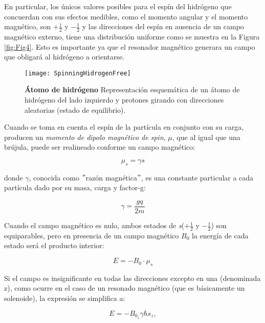 \documentclass[11pt,letterpaper]{article}
\numberwithin{equation}{subsection}
\numberwithin{table}{subsection}
\begin{document}
\bigskip
\noindent En particular, los únicos valores posibles para el espín del hidrógeno que concuerdan con sus efectos medibles, como el momento angular y el momento magnético, son $+\frac{1}{2}$ y $-\frac{1}{2}$ \cite{brown2014magnetic} y las direcciones del espín en ausencia de un campo magnético externo, tiene una distribución uniforme como se muestra en la Figura \ref{fig:Fig4}. Esto es importante ya que el resonador magnético generara un campo que obligará al hidrógeno a orientarse. 

\begin{figure}[H]
\centering
	\texttt{[image: SpinningHidrogenFree]}
	\captionsetup{labelfont=bf}
	\caption{\scriptsize \textbf{Átomo de hidrógeno} Representación esquemática de un átomo de hidrógeno del lado izquierdo y protones girando con direcciones aleatorias (estado de equilibrio).}
	\label{fig:Fig5}
\end{figure}


\bigskip
\noindent Cuando se toma en cuenta el espín de la partícula en conjunto con su carga, producen un \textit{momento de dipolo magnético de spin}, $\mu$, que al igual que una brújula, puede ser realineado conforme un campo magnético:

\begin{equation}
\mu_s = \gamma s
\end{equation}

\noindent donde $\gamma$, conocida como $"$razón magnética$"$, es una constante particular a cada partícula dado por su masa, carga y factor-g:

\begin{equation}
\gamma = \frac{gq}{2m}
\end{equation}

\noindent Cuando el campo magnético es nulo, ambos estados de \textit{s}($+\frac{1}{2}$ y $-\frac{1}{2}$) son equiparables, pero en presencia de un campo magnético $B_0$ la energía de cada estado será el producto interior: 

\begin{equation}
E = -B_0 \cdot \mu_s
\end{equation}

\bigskip
\noindent Si el campo es insignificante en todas las direcciones excepto en una (denominada z), como ocurre en el caso de un resonado magnético (que es básicamente un solenoide), la expresión se simplifica a:

\begin{equation}
E = -B_{0_z}\gamma\hbar s_z, 
\end{equation}
\end{document}
